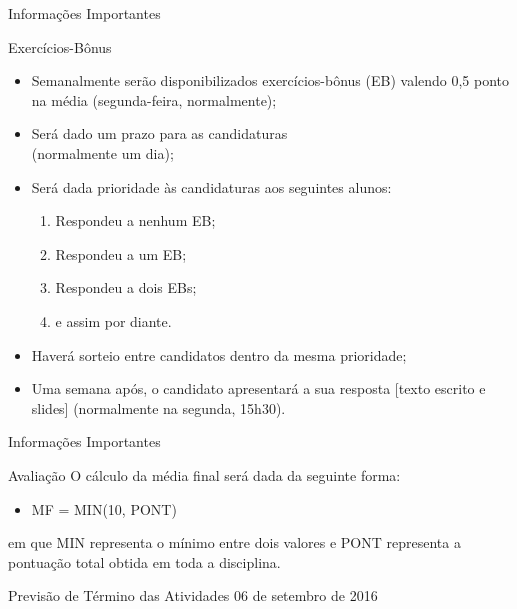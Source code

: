 \documentclass[xcolor=dvipsnames,table]{beamer}
\begin{document}
    \begin{frame}[shrink]{Informações Importantes}
		\begin{block}{Exercícios-Bônus}
			\begin{itemize}
				\item Semanalmente serão disponibilizados exercícios-bônus (EB) valendo 0,5 ponto na média (segunda-feira, normalmente); \pause
                \item Será dado um prazo para as candidaturas\\
                (normalmente um dia); \pause
                \item Será dada prioridade às candidaturas aos seguintes alunos: \pause
                	\begin{enumerate}
                    	\item Respondeu a nenhum EB; \pause
                        \item Respondeu a um EB; \pause
                        \item Respondeu a dois EBs; \pause
                        \item e assim por diante.
                    \end{enumerate} \pause
                \item Haverá sorteio entre candidatos dentro da mesma prioridade; \pause
            	\item Uma semana após, o candidato apresentará a sua resposta [texto escrito e slides] (normalmente na segunda, 15h30).
			\end{itemize}
		\end{block}
	\end{frame}
	
	\begin{frame}{Informações Importantes}
		\begin{block}{Avaliação}
			O cálculo da média final será dada da seguinte forma:
			\begin{itemize}
				\item MF = MIN(10, PONT)
			\end{itemize}
			em que MIN representa o mínimo entre dois valores e PONT representa a pontuação total obtida em toda a disciplina.
		\end{block} \pause
		\begin{exampleblock}{Previsão de Término das Atividades}
			06 de setembro de 2016
		\end{exampleblock}
	\end{frame}
\end{document}
